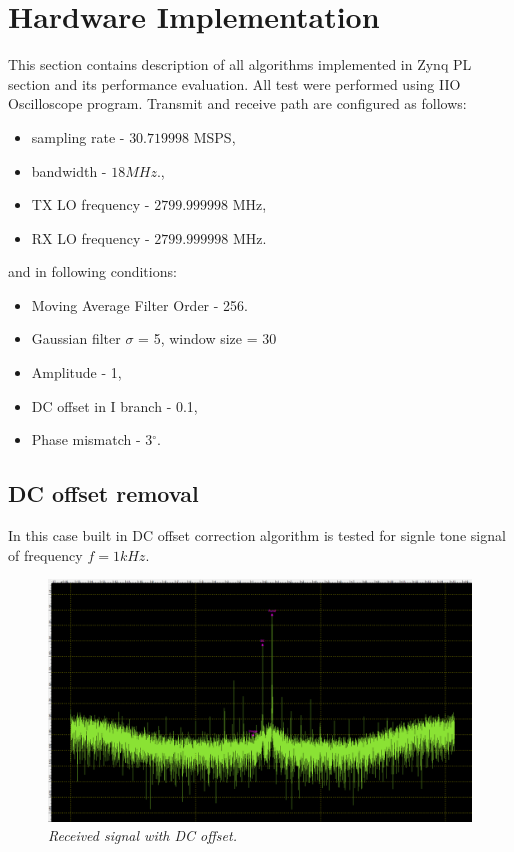\documentclass[en,printmode]{mgr}
\begin{document}
	\section{Hardware Implementation}
		This section contains description of all algorithms implemented in Zynq PL section and its 
		performance evaluation.
		All test were performed using IIO Oscilloscope program.
		Transmit and receive path are configured as follows:
		\begin{itemize}
			\item sampling rate - $30.719998$ MSPS,
			\item bandwidth - $18MHz$.,
			\item TX LO frequency - $2799.999998$ MHz,
			\item RX LO frequency - $2799.999998$ MHz.
		\end{itemize}
		and in following conditions:
		\begin{itemize}
			\item Moving Average Filter Order - 256.
			\item Gaussian filter $\sigma$ = 5, window size = 30
			\item Amplitude - 1,
			\item DC offset in I branch - 0.1,
			\item Phase mismatch - 3$^\circ$.
		\end{itemize}
	\newpage
	 \subsection*{DC offset removal}
	 	In this case built in DC offset correction algorithm is tested for signle tone
		signal of frequency $f=1kHz$.
		
		\begin{figure}[H]
    		\centering
   			\includegraphics[width=\textwidth]{plots/dc_input.png}
   		 	\caption{\textit{Received signal with DC offset.}}
   		\end{figure}
   		
\end{document}
